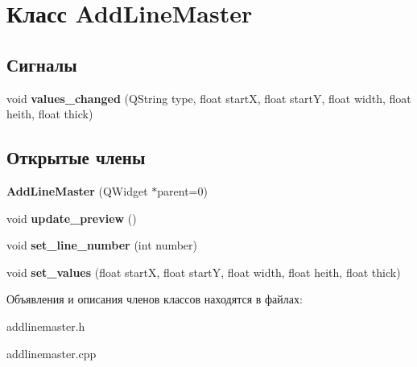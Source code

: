 \hypertarget{class_add_line_master}{\section{Класс \-Add\-Line\-Master}
\label{class_add_line_master}
}
\subsection*{Сигналы}
\begin{DoxyCompactItemize}
\item 
\hypertarget{class_add_line_master_ab9dbcd03d215f1a4e1821bb06240fdf3}{void {\bfseries values\-\_\-changed} (\-Q\-String type, float start\-X, float start\-Y, float width, float heith, float thick)}\label{class_add_line_master_ab9dbcd03d215f1a4e1821bb06240fdf3}

\end{DoxyCompactItemize}
\subsection*{Открытые члены}
\begin{DoxyCompactItemize}
\item 
\hypertarget{class_add_line_master_ac19beddfea66a58b1d7eec1cb3bf2372}{{\bfseries \-Add\-Line\-Master} (\-Q\-Widget $\ast$parent=0)}\label{class_add_line_master_ac19beddfea66a58b1d7eec1cb3bf2372}

\item 
\hypertarget{class_add_line_master_a312a39e8f1c19fc7d86c476267e559cb}{void {\bfseries update\-\_\-preview} ()}\label{class_add_line_master_a312a39e8f1c19fc7d86c476267e559cb}

\item 
\hypertarget{class_add_line_master_a8f90611b16534d32ecdf93dd45601996}{void {\bfseries set\-\_\-line\-\_\-number} (int number)}\label{class_add_line_master_a8f90611b16534d32ecdf93dd45601996}

\item 
\hypertarget{class_add_line_master_a7b703800ea62c18154a7eabd07331a9f}{void {\bfseries set\-\_\-values} (float start\-X, float start\-Y, float width, float heith, float thick)}\label{class_add_line_master_a7b703800ea62c18154a7eabd07331a9f}

\end{DoxyCompactItemize}


Объявления и описания членов классов находятся в файлах\-:\begin{DoxyCompactItemize}
\item 
addlinemaster.\-h\item 
addlinemaster.\-cpp\end{DoxyCompactItemize}
